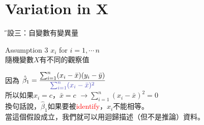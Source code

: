 \documentclass[xcolor=dvipsnames]{beamer}
\begin{document}
\section{Variation in X}
\begin{frame}{\H 假設三：自變數有變異量}
\begin{block}{Assumption 3}
$\mathit{x}_{i}$\hspace{0.5em} for $i=1,\cdots\,n$\\
隨機變數$X$有不同的觀察值
\end{block}
因為
$ \hat{\beta}_{1}=\mathlarger{\frac{\sum_{i=1}^n(x_{i}-\bar{x})(y_{i}-\bar{y})}{\color{rgb:blue,8;yellow,3}{\sum_{i=1}^n(x_{i}-\bar{x})^2}}} $\\
所以如果$\mathit{x}_{i}=c$，$\bar{x}=c$ $\longrightarrow  \sum_{i=1}^n(x_{i}-\bar{x})^2=0$\\
換句話說，$ \hat{\beta}_{1} $如果要被\textcolor{red}{identify}，$\mathit{x}_{i}$不能相等。\\
\medskip
當這個假設成立，我們就可以用迴歸描述（但不是推論）資料。
\end{frame}
\end{document}
